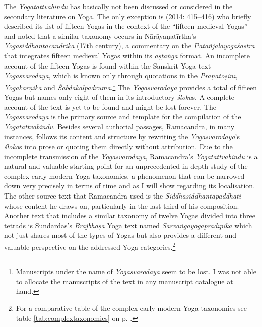 The \textit{Yogatattvabindu} has basically not been discussed or considered in the secondary literature on Yoga. The only exception is \citeauthor{birch2014} (2014: 415–416) who briefly described its list of fifteen Yogas in the context of the ``fifteen medieval Yogas'' and noted that a similar taxonomy occurs in Nārāyaṇatīrtha’s \textit{Yogasiddhāntacandrikā} (17th century), a commentary on the \textit{Pātañjalayogaśāstra} that integrates fifteen medieval Yogas within its \textit{aṣṭāṅga} format. An incomplete account of the fifteen Yogas is found within the Sanskrit Yoga text \textit{Yogasvarodaya}, which is known only through quotations in the \textit{Prāṇatoṣinī}, \textit{Yogakarṇikā} and \emph{Śabdakalpadruma}.\footnote{Manuscripts under the name of \textit{Yogasvarodaya} seem to be lost. I was not able to allocate the manuscripts of the text in any manuscript catalogue at hand.} The \textit{Yogasvarodaya} provides a total of fifteen Yogas but names only eight of them in its introductory \textit{śloka}s. A complete account of the text is yet to be found and might be lost forever. The \textit{Yogasvarodaya} is the primary source and template for the compilation of the \textit{Yogatattvabindu}. Besides several authorial passages, Rāmacandra, in many instances, follows its content and structure by rewriting the \textit{Yogasvarodaya}’s \textit{śloka}s into prose or quoting them directly without attribution. Due to the incomplete transmission of the \textit{Yogasvarodaya}, Rāmacandra’s \textit{Yogatattvabindu} is a natural and valuable starting point for an unprecedented in-depth study of the complex early modern Yoga taxonomies, a phenomenon that can be narrowed down very precisely in terms of time and as I will show regarding its localisation. The other source text that Rāmacandra used is the \textit{Siddhasiddhāntapaddhati} whose content he draws on, particularly in the last third of his composition. Another text that includes a similar taxonomy of twelve Yogas divided into three tetrads is Sundardās’s \textit{Brājbhāṣa} Yoga text named \textit{Sarvāṅgayogapradīpikā} which not just shares most of the types of Yogas but also provides a different and valuable perspective on the addressed Yoga categories.\footnote{For a comparative table of the complex early modern Yoga taxonomies see table \ref{tab:complextaxonomies} on p. \pageref{tab:complextaxonomies}.}

